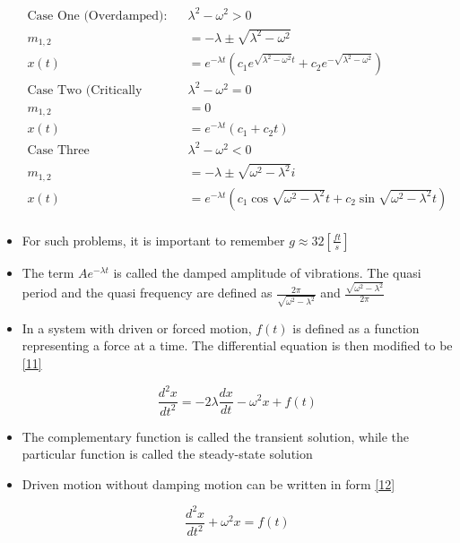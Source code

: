 \documentclass[12pt]{article}
\begin{document}
\begin{itemize}
  \begin{equation}
    \begin{split}
      \text{Case One (Overdamped): }& \lambda^2-\omega^2>0\\
      m_{1,2}&=-\lambda \pm\sqrt{\lambda^2-\omega^2}\\
      x(t)&=e^{-\lambda t}\left(c_1e^{\sqrt{\lambda^2-\omega^2}t}+c_2e^{-\sqrt{\lambda^2-\omega^2}} \right)\\
      \text{Case Two (Critically Damped): }& \lambda^2-\omega^2=0\\
      m_{1,2}&=0\\
      x(t)&=e^{-\lambda t}(c_1+c_2t)\\
      \text{Case Three (Underdamped): }& \lambda^2-\omega^2<0\\
      m_{1,2}&=-\lambda \pm\sqrt{\omega^2-\lambda^2}i\\
      x(t)&=e^{-\lambda t}\left(c_1\cos\sqrt{\omega^2-\lambda^2}t+c_2\sin\sqrt{\omega^2-\lambda^2}t\right)\\
    \end{split}
    \label{10}
  \end{equation}

\item For such problems, it is important to remember $g\approx32\left[  \frac{ft}{s}\right]$

\item The term $Ae^{-\lambda t}$ is called the damped amplitude of vibrations. The quasi period and the quasi frequency are defined as $\frac{2\pi}{\sqrt{\omega^2-\lambda^2}}$ and $\frac{\sqrt{\omega^2-\lambda^2}}{2\pi}$

\item In a system with driven or forced motion, $f(t)$ is defined as a function representing a force at a time. The differential equation is then modified to be \eqref{11}

  \begin{equation}
    \frac{d^2x}{dt^2}=-2\lambda\frac{dx}{dt}-\omega^2x+f(t)
    \label{11}
  \end{equation}

\item The complementary function is called the transient solution, while the particular  function is called the steady-state solution

\item Driven motion without damping motion can be written in form \eqref{12}

  \begin{equation}
    \frac{d^2x}{dt^2}+\omega^2x=f(t)
    \label{12}
  \end{equation}


\end{itemize}
\end{document}

